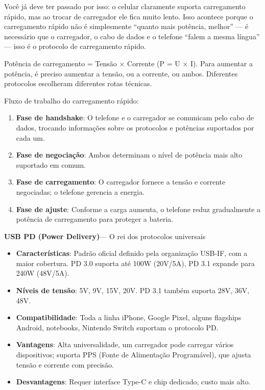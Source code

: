 
Você já deve ter passado por isso: o celular claramente suporta carregamento rápido, mas ao trocar de carregador ele fica muito lento. Isso acontece porque o carregamento rápido não é simplesmente “quanto mais potência, melhor” — é necessário que o carregador, o cabo de dados e o telefone “falem a mesma língua” — isso é o protocolo de carregamento rápido.


Potência de carregamento = Tensão × Corrente (P = U × I). Para aumentar a potência, é preciso aumentar a tensão, ou a corrente, ou ambos. Diferentes protocolos escolheram diferentes rotas técnicas.

Fluxo de trabalho do carregamento rápido:

\begin{enumerate}
  \item \textbf{Fase de handshake}: O telefone e o carregador se comunicam pelo cabo de dados, trocando informações sobre os protocolos e potências suportados por cada um.
  \item \textbf{Fase de negociação}: Ambos determinam o nível de potência mais alto suportado em comum.
  \item \textbf{Fase de carregamento}: O carregador fornece a tensão e corrente negociadas; o telefone gerencia a energia.
  \item \textbf{Fase de ajuste}: Conforme a carga aumenta, o telefone reduz gradualmente a potência de carregamento para proteger a bateria.
\end{enumerate}


\textbf{USB PD (Power Delivery)}— O rei dos protocolos universais

\begin{itemize}
  \item \textbf{Características}: Padrão oficial definido pela organização USB-IF, com a maior cobertura. PD 3.0 suporta até 100W (20V/5A), PD 3.1 expande para 240W (48V/5A).
  \item \textbf{Níveis de tensão}: 5V, 9V, 15V, 20V. PD 3.1 também suporta 28V, 36V, 48V.
  \item \textbf{Compatibilidade}: Toda a linha iPhone, Google Pixel, alguns flagships Android, notebooks, Nintendo Switch suportam o protocolo PD.
  \item \textbf{Vantagens}: Alta universalidade, um carregador pode carregar vários dispositivos; suporta PPS (Fonte de Alimentação Programável), que ajusta tensão e corrente com precisão.
  \item \textbf{Desvantagens}: Requer interface Type-C e chip dedicado, custo mais alto.
\end{itemize}

